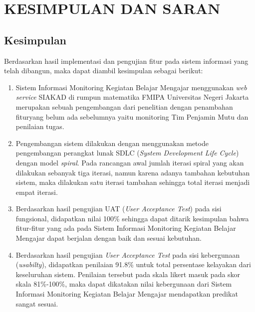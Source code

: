 
\chapter{KESIMPULAN DAN SARAN}

\section{Kesimpulan}
Berdasarkan hasil implementasi dan pengujian fitur pada sistem informasi yang telah dibangun, maka dapat diambil kesimpulan sebagai berikut:

\begin{enumerate}
	\item Sistem Informasi Monitoring Kegiatan Belajar Mengajar menggunakan \textit{web service} SIAKAD di rumpun matematika FMIPA Universitas Negeri Jakarta merupakan sebuah pengembangan dari penelitian \cite{Kultsum2021} dengan penambahan fituryang belum ada sebelumnya yaitu monitoring Tim Penjamin Mutu dan penilaian tugas.

	\item  Pengembangan sistem dilakukan dengan menggunakan metode pengembangan perangkat lunak SDLC (\textit{System Development Life Cycle}) dengan model \textit{spiral}. Pada rancangan awal jumlah iterasi spiral yang akan dilakukan sebanyak tiga iterasi, namun karena adanya tambahan kebutuhan sistem, maka dilakukan satu iterasi tambahan sehingga total iterasi menjadi empat iterasi.
	
	
	\item  Berdasarkan hasil pengujian UAT (\textit{User Acceptance Test}) pada sisi fungsional, didapatkan nilai 100\% sehingga dapat ditarik kesimpulan bahwa fitur-fitur yang ada pada Sistem Informasi Monitoring Kegiatan Belajar Mengajar dapat berjalan dengan baik dan sesuai kebutuhan.
	
	\item Berdasarkan hasil pengujian \textit{User Acceptance Test} pada sisi kebergunaan (\textit{usabilty}), didapatkan penilaian 91.8\% untuk total persentase kelayakan dari keseluruhan sistem. Penilaian tersebut pada skala likert masuk pada skor skala 81\%-100\%, maka dapat dikatakan nilai kebergunaan dari Sistem Informasi Monitoring Kegiatan Belajar Mengajar mendapatkan predikat sangat sesuai.
\end{enumerate}

